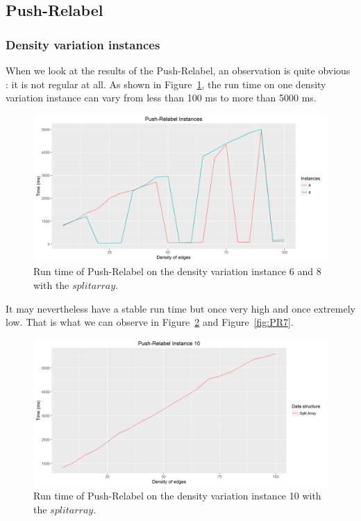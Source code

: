 \subsection{Push-Relabel}
\subsubsection{Density variation instances}
When we look at the results of the Push-Relabel, an observation is quite obvious : it is not regular at all. As shown in Figure~\ref{fig:PR6}, the run time on one density variation instance can vary from less than 100 ms to more than 5000 ms.
\begin{figure}[H]
\begin{center}
\includegraphics[scale=0.5]{images/pri68.png}
\caption{Run time of Push-Relabel on the density variation instance 6 and 8 with the $split array$.}
\label{fig:PR6}
\end{center}
\end{figure}
It may nevertheless have a stable run time but once very high and once extremely low. That is what we can observe in Figure~\ref{fig:PR10} and Figure~\ref{fig:PR7}.
\begin{figure}[H]
\begin{center}
\includegraphics[scale=0.5]{images/pri10.png}
\caption{Run time of Push-Relabel on the density variation instance 10 with the $split array$.}
\label{fig:PR10}
\end{center}
\end{figure}
